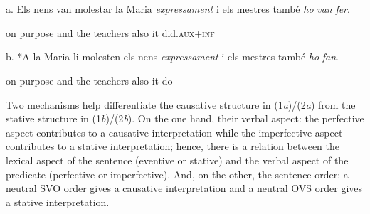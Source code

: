 \documentclass[output=paper,modfonts,nonflat]{langsci/langscibook}
\begin{document}
\ea%
    \label{ex:key:3}
    \gll\\
        \\
    \glt
    \z

         a. Els nens van molestar la Maria \textit{expressament} i   els  mestres també \textit{ho} \textit{van} \textit{fer}.

                                                            on purpose   and the teachers also    it  did.\textsc{aux+inf}

      b. *A la Maria li molesten els nens \textit{expressament} i    els mestres  també \textit{ho} \textit{fan}.

                                                               on purpose   and the teachers also    it   do

Two mechanisms help differentiate the causative structure in (1\textit{a})/(2\textit{a}) from the stative structure in (1\textit{b})/(2\textit{b}). On the one hand, their verbal aspect: the perfective aspect contributes to a causative interpretation while the imperfective aspect contributes to a stative interpretation; hence, there is a relation between the lexical aspect of the sentence (eventive or stative) and the verbal aspect of the predicate (perfective or imperfective). And, on the other, the sentence order: a neutral SVO order gives a causative interpretation and a neutral OVS order gives a stative interpretation.
\end{document}
